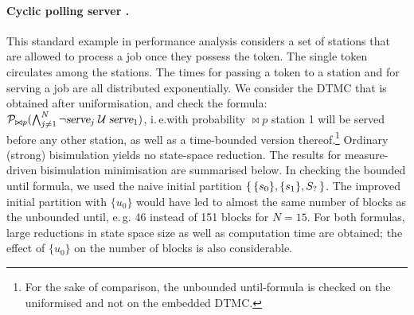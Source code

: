 \documentclass{llncs}
\begin{document}
\paragraph{Cyclic polling server \cite{IbeT_SAC90}.}
This standard example in performance analysis considers a set of stations that
are allowed to process a job once they possess the token.
The single token circulates among the stations.
The times for passing a token to a station and for serving a job are all distributed 
exponentially.
We consider the DTMC that is obtained after uniformisation, and check the
formula: ${\cal P}_{\bowtie p}(\bigwedge_{j \neq 1}^N \neg \mbox{\sl serve}_j \mathrel{\mathcal{U}} \mbox{\sl serve}_1)$, 
i.\,e.\@ with probability $\bowtie p$ station 1 will be served before any other 
station, as well as a time-bounded version thereof.\footnote{For the sake of
comparison, the unbounded until-formula is checked on the uniformised
and not on the embedded DTMC.}
Ordinary (strong) bisimulation yields no state-space reduction.
The results for measure-driven bisimulation minimisation are summarised
below.
In checking the bounded until formula, we used the naive initial partition 
$\{ \,  \{s_0\}, \{s_1\}, S_?  \, \}$. 
The improved initial partition with $\{u_0\}$ would have led to almost the same 
number of blocks as the unbounded until, e.\,g. 46 instead of 151 blocks for $N=15$.
For both formulas, large reductions in state space size as well as computation 
time are obtained; the effect of $\{u_0\}$ on the number of blocks is also considerable.
\end{document}
